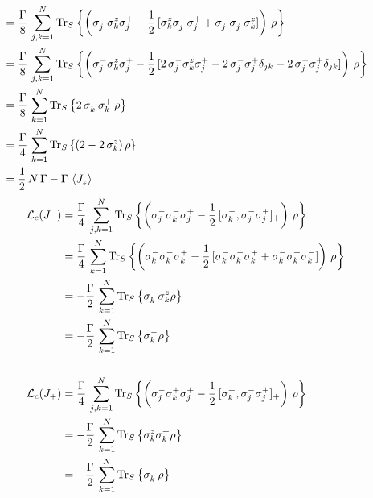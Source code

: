 \documentclass{article}
\begin{document}
\begin{appendices}
\begin{align*}
    &=\frac{\Gamma}{8}\,\sum_{j,k=1}^N \operatorname{Tr}_S\left\{\left( \sigma_j^- \sigma_k^z \sigma_j^+ -\frac{1}{2}\,[\sigma_k^z\sigma_j^-\sigma_j^++\sigma_j^-\sigma_j^+\sigma_k^z]   \right)\,\rho\right\}\\
    &=\frac{\Gamma}{8}\,\sum_{j,k=1}^N \operatorname{Tr}_S\left\{\left( \sigma_j^- \sigma_k^z \sigma_j^+ -\frac{1}{2}\,[2\,\sigma_j^-\sigma_k^z\sigma_j^+  -2\, \sigma_j^-\sigma_j^+\delta_{jk}-2\, \sigma_j^-\sigma_j^+\delta_{jk}]   \right)\,\rho\right\}\\
    &=\frac{\Gamma}{8}\,\sum_{k=1}^N \operatorname{Tr}_S\left\{2\, \sigma_k^-\sigma_k^+  \,\rho\right\}\\
    &=\frac{\Gamma}{4}\,\sum_{k=1}^N \operatorname{Tr}_S\left\{ (2-2\,\sigma_k^z)  \,\rho\right\}\\
    &=\frac{1}{2}\,N\,\Gamma-\Gamma\,\braket{J_z}
\end{align*}
\begin{align*}
    \mathcal{L}_c(J_-)&=\frac{\Gamma}{4}\,\sum_{j,k=1}^N \operatorname{Tr}_S\left\{\left( \sigma_j^- \sigma_k^- \sigma_j^+ -\frac{1}{2}\,[\sigma_k^-,\sigma_j^-\sigma_j^+]_+   \right)\,\rho\right\}\\
    &=\frac{\Gamma}{4}\,\sum_{k=1}^N \operatorname{Tr}_S\left\{\left( \sigma_k^- \sigma_k^- \sigma_k^+ -\frac{1}{2}\,[\sigma_k^-\sigma_k^-\sigma_k^++\sigma_k^-\sigma_k^+\sigma_k^-]   \right)\,\rho\right\}\\
    &=-\frac{\Gamma}{2}\,\sum_{k=1}^N\operatorname{Tr}_S\left\{\sigma_k^-\sigma_k^z\rho\right\}\\
    &=-\frac{\Gamma}{2}\,\sum_{k=1}^N\operatorname{Tr}_S\left\{\sigma_k^-\rho\right\}\\\\
    \mathcal{L}_c(J_+)&=\frac{\Gamma}{4}\,\sum_{j,k=1}^N \operatorname{Tr}_S\left\{\left( \sigma_j^- \sigma_k^+ \sigma_j^+ -\frac{1}{2}\,[\sigma_k^+,\sigma_j^-\sigma_j^+]_+   \right)\,\rho\right\}\\
    &=-\frac{\Gamma}{2}\,\sum_{k=1}^N\operatorname{Tr}_S\left\{\sigma_k^z\sigma_k^+\rho\right\}\\
    &=-\frac{\Gamma}{2}\,\sum_{k=1}^N\operatorname{Tr}_S\left\{\sigma_k^+\rho\right\}
\end{align*}


\end{appendices}
\end{document}

